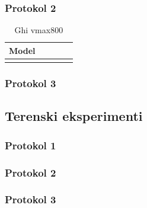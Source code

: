 \subsubsection{Protokol 2}
\begin{table}[!htbp]
	\centering
	\begin{tabular}{l S[table-format=1.2, round-mode=places, round-precision=2] S[table-format=1.2, round-mode=places, round-precision=2] S[table-format=1.2, round-mode=places, round-precision=2] S[table-format=1.2, round-mode=places, round-precision=2]}
		\toprule
		\textbf{Model} &  &  &  &  \\
		\midrule
		\bottomrule
	\end{tabular}
	\caption{Ghi vmax800}
	\label{tab:stage2-lab-2-mean}
\end{table}










\subsubsection{Protokol 3}












\subsection{Terenski eksperimenti}











\subsubsection{Protokol 1}














\subsubsection{Protokol 2}









\subsubsection{Protokol 3}










